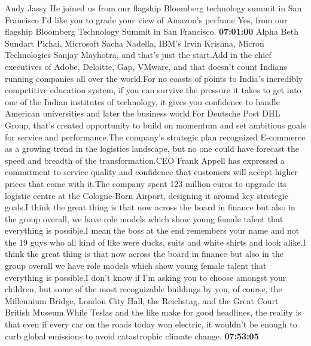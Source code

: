 \documentclass{article}%
\begin{document}
Andy Jassy He joined us from our flagship Bloomberg technology summit in San Francisco I'd like you to grade your view of Amazon's perfume  Yes, from our flagship Bloomberg Technology Summit in San Francisco.%
\textbf{07:01:00}%
Alpha Beth Sundart Pichai, Microsoft Sacha Nadella, IBM's Irvin Krishna, Micron Technologies Sanjay Mayhotra, and that's just the start.Add in the chief executives of Adobe, Deloitte, Gap, VMware, and that doesn't count Indians running companies all over the world.For no coasts of points to India's incredibly competitive education system, if you can survive the pressure it takes to get into one of the Indian institutes of technology, it gives you confidence to handle American universities and later the business world.For Deutsche Post DHL Group, that's created opportunity to build on momentum and set ambitious goals for service and performance.The company's strategic plan recognized E{-}commerce as a growing trend in the logistics landscape, but no one could have forecast the speed and breadth of the transformation.CEO Frank Appell has expressed a commitment to service quality and confidence that customers will accept higher prices that come with it.The company spent 123 million euros to upgrade its logistic centre at the Cologne{-}Born Airport, designing it around key strategic goals.I think the great thing is that now across the board in finance but also in the group overall, we have role models which show young female talent that everything is possible.I mean the boss at the end remembers your name and not the 19 guys who all kind of like were ducks, suits and white shirts and look alike.I think the great thing is that now across the board in finance but also in the group overall we have role models which show young female talent that everything is possible.I don't know if I'm asking you to choose amongst your children, but some of the most recognizable buildings by you, of course, the Millennium Bridge, London City Hall, the Reichstag, and the Great Court British Museum.While Teslas and the like make for good headlines, the reality is that even if every car on the roads today won electric, it wouldn't be enough to curb global emissions to avoid catastrophic climate change.%
\textbf{07:53:05}%
\end{document}
